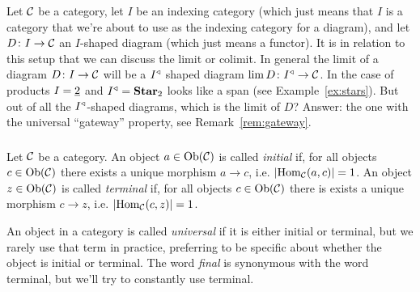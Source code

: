 \documentclass[CT4S-EN-RU]{subfiles}
\begin{document}
\begin{blockENG}
Let $\mathcal{C}$ be a category, let $I$ be an indexing category (which just means that $I$ is a category that we're about to use as the indexing category for a diagram), and let $D\colon I\rightarrow\mathcal{C}$ an $I$-shaped diagram (which just means a functor). It is in relation to this setup that we can discuss the limit or colimit. In general the limit of a diagram $D\colon I\rightarrow\mathcal{C}$ will be a $I^\triangleleft$ shaped diagram $\lim D\colon I^\triangleleft\rightarrow\mathcal{C}$. In the case of products $I=\underline{2}$ and $I^\triangleleft={\mathbf{Star}}_2$ looks like a span (see Example~\ref{ex:stars}). But out of all the $I^\triangleleft$-shaped diagrams, which is the limit of $D$? Answer: the one with the universal “gateway” property, see Remark~\ref{rem:gateway}.
\end{blockENG}

\begin{blockRUS}
\end{blockRUS}


\subsubsection{}

\begin{definitionENG}
Let $\mathcal{C}$ be a category. An object $a\in\textnormal{Ob}(\mathcal{C})$ is called {\em initial} if, for all objects $c\in\textnormal{Ob}(\mathcal{C})$ there exists a unique morphism $a\to c$, i.e. $|\textnormal{Hom}_\mathcal{C}(a,c)|=1$. An object $z\in\textnormal{Ob}(\mathcal{C})$ is called {\em terminal} if, for all objects $c\in\textnormal{Ob}(\mathcal{C})$ there is exists a unique morphism $c\to z$, i.e. $|\textnormal{Hom}_\mathcal{C}(c,z)|=1$. 
\end{definitionENG}

\begin{definitionRUS}
\end{definitionRUS}

\begin{blockENG}
An object in a category is called {\em universal} if it is either initial or terminal, but we rarely use that term in practice, preferring to be specific about whether the object is initial or terminal. The word {\em final} is synonymous with the word terminal, but we'll try to constantly use terminal. 
\end{blockENG}

\begin{blockRUS}
\end{blockRUS}
\end{document}

